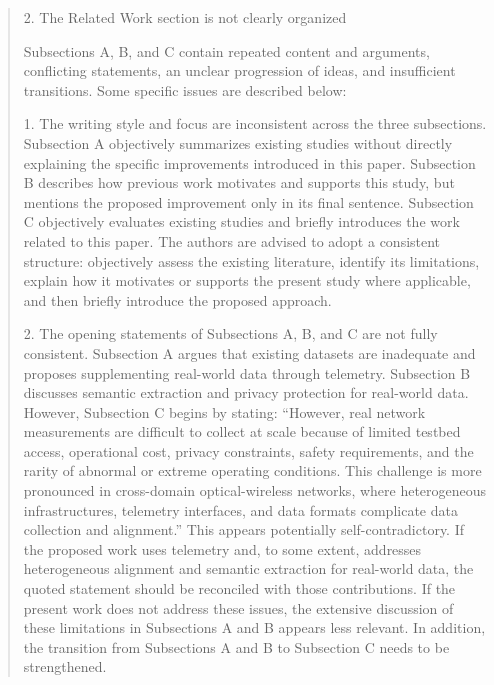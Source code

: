 \documentclass[11pt]{article}
\newenvironment{reviewercomment}{\begin{quote}\color{reviewblue}}{\end{quote}}
\begin{document}
\begin{reviewercomment}
2. The Related Work section is not clearly organized

Subsections A, B, and C contain repeated content and arguments, conflicting statements, an unclear progression of ideas, and insufficient transitions. Some specific issues are described below:

1. The writing style and focus are inconsistent across the three subsections. Subsection A objectively summarizes existing studies without directly explaining the specific improvements introduced in this paper. Subsection B describes how previous work motivates and supports this study, but mentions the proposed improvement only in its final sentence. Subsection C objectively evaluates existing studies and briefly introduces the work related to this paper. The authors are advised to adopt a consistent structure: objectively assess the existing literature, identify its limitations, explain how it motivates or supports the present study where applicable, and then briefly introduce the proposed approach.

2. The opening statements of Subsections A, B, and C are not fully consistent. Subsection A argues that existing datasets are inadequate and proposes supplementing real-world data through telemetry. Subsection B discusses semantic extraction and privacy protection for real-world data. However, Subsection C begins by stating: ``However, real network measurements are difficult to collect at scale because of limited testbed access, operational cost, privacy constraints, safety requirements, and the rarity of abnormal or extreme operating conditions. This challenge is more pronounced in cross-domain optical-wireless networks, where heterogeneous infrastructures, telemetry interfaces, and data formats complicate data collection and alignment.'' This appears potentially self-contradictory. If the proposed work uses telemetry and, to some extent, addresses heterogeneous alignment and semantic extraction for real-world data, the quoted statement should be reconciled with those contributions. If the present work does not address these issues, the extensive discussion of these limitations in Subsections A and B appears less relevant. In addition, the transition from Subsections A and B to Subsection C needs to be strengthened.


\end{reviewercomment}
\end{document}
